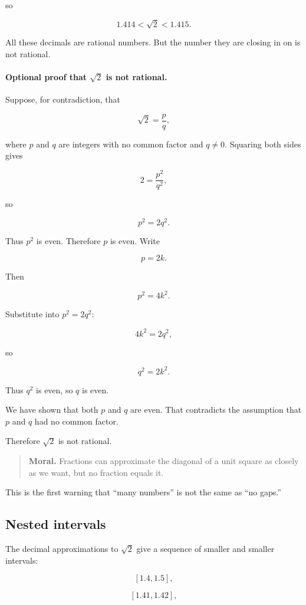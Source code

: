 so

\[
1.414<\sqrt2<1.415.
\]

All these decimals are rational numbers. But the number they are closing in on is not rational.

\paragraph{Optional proof that \(\sqrt2\) is not rational.}
Suppose, for contradiction, that

\[
\sqrt2=\frac{p}{q},
\]

where \(p\) and \(q\) are integers with no common factor and \(q\neq 0\). Squaring both sides gives

\[
2=\frac{p^2}{q^2},
\]

so

\[
p^2=2q^2.
\]

Thus \(p^2\) is even. Therefore \(p\) is even. Write

\[
p=2k.
\]

Then

\[
p^2=4k^2.
\]

Substitute into \(p^2=2q^2\):

\[
4k^2=2q^2,
\]

so

\[
q^2=2k^2.
\]

Thus \(q^2\) is even, so \(q\) is even.

We have shown that both \(p\) and \(q\) are even. That contradicts the assumption that \(p\) and \(q\) had no common factor.

Therefore \(\sqrt2\) is not rational.

\begin{quote}
\textbf{Moral.}
Fractions can approximate the diagonal of a unit square as closely as we want, but no fraction equals it.
\end{quote}

This is the first warning that ``many numbers'' is not the same as ``no gaps.''

\subsection{Nested intervals}
\label{subsec:nested-intervals}

The decimal approximations to \(\sqrt2\) give a sequence of smaller and smaller intervals:

\[
[1.4,1.5],
\]

\[
[1.41,1.42],
\]

